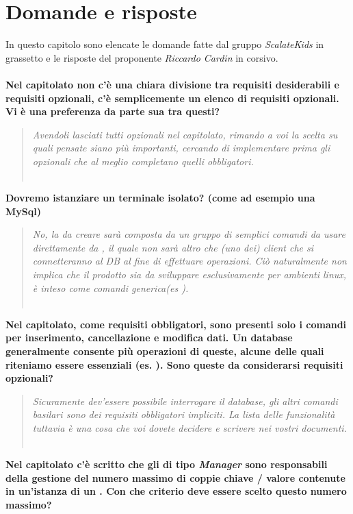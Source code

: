 \documentclass{scalatekids-article}
\begin{document}
\section{Domande e risposte}
In questo capitolo sono elencate le domande fatte dal gruppo \textit{ScalateKids} in grassetto e le risposte del proponente \textit{Riccardo Cardin} in corsivo.
\textbf{\\ \\Nel capitolato non c'è una chiara divisione tra requisiti desiderabili e requisiti opzionali, c'è semplicemente un elenco di requisiti opzionali. Vi è una preferenza da parte sua tra questi?}
\begin{quote}
  \textit{Avendoli lasciati tutti opzionali nel capitolato, rimando a voi la
    scelta su quali pensate siano più importanti, cercando di implementare prima
    gli opzionali che al meglio completano quelli obbligatori.\\ \\}
\end{quote}
\textbf{Dovremo istanziare un terminale isolato? (come ad esempio una  MySql)}
\begin{quote}
  \textit{No, la  da creare sarà composta da un gruppo di semplici
    comandi da usare direttamente da , il quale non sarà altro
    che (uno dei) client che si connetteranno al DB al fine di effettuare
    operazioni. Ciò naturalmente non implica che il prodotto sia da sviluppare
    esclusivamente per ambienti linux,  è inteso come
     comandi generica(es ).\\ \\}
\end{quote}
\textbf{Nel capitolato, come requisiti obbligatori, sono presenti solo i comandi per inserimento, cancellazione e modifica dati. Un database generalmente consente più operazioni di queste, alcune delle quali riteniamo essere essenziali (es. ). Sono queste da considerarsi requisiti opzionali?}
\begin{quote}
  \textit{Sicuramente dev'essere possibile interrogare il database, gli altri comandi basilari sono dei requisiti obbligatori impliciti. La lista delle funzionalità tuttavia è una cosa che voi dovete decidere e scrivere nei vostri documenti.\\ \\}
\end{quote}
\textbf{Nel capitolato c'è scritto che gli  di tipo \textit{Manager} sono responsabili della gestione del numero massimo di coppie chiave / valore contenute in un’istanza di un . Con che criterio deve essere scelto questo numero massimo?}
\end{document}
